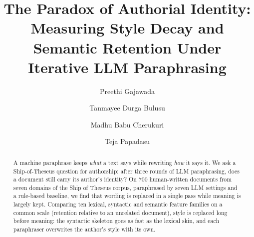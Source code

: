\documentclass[sigconf,nonacm]{acmart}
\begin{document}
\title{The Paradox of Authorial Identity: Measuring Style Decay
and Semantic Retention Under Iterative LLM Paraphrasing}

\author{Preethi Gajawada}

\author{Tanmayee Durga Bulusu}

\author{Madhu Babu Cherukuri}

\author{Teja Papadasu}

\begin{abstract}
A machine paraphrase keeps \emph{what} a text says while rewriting \emph{how} it says it. We ask
a Ship-of-Theseus question for authorship: after three rounds of LLM paraphrasing, does a document
still carry its author's identity? On 700 human-written documents from seven domains of the Ship of
Theseus corpus, paraphrased by seven LLM settings and a rule-based baseline, we find that wording
is replaced in a single pass while meaning is largely kept. Comparing ten lexical, syntactic and
semantic feature families on a common scale (retention relative to an unrelated document), style is
replaced long before meaning: the syntactic skeleton goes as fast as the lexical skin, and each
paraphraser overwrites the author's style with its own.
\end{abstract}

\maketitle









\end{document}
